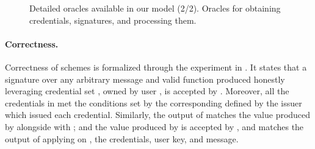 {\begin{figure*}[htp!]
{\begin{minipage}[t]{.5\textwidth}
        \procedure{$\SIGN(\oid,\uid,\scid,\msg,\feval)$}{%
          \pcif \uid \notin \HU: \pcreturn \bot \\
          (\sig,\yeval) \gets \Sign(\PRVUK[\uid],\PUBOK[\oid],\CRED[\scid],\msg,
          \feval) \\
          \SIG[\uid] \gets \SIG[\uid] \cup
          \lbrace (\oid,\scid,\sig,\yeval,\msg,\feval) \rbrace \\
          \pcreturn (\sig,\yeval) \\
        }                

        
      \end{minipage}
      
    }

    \caption{Detailed oracles available in our model (2/2). Oracles for
      obtaining credentials, signatures, and processing them.}
    \label{fig:oracles2}
  \end{figure*}
}

\paragraph{Correctness.} %
Correctness of \UAS schemes is formalized through the experiment in
. It states that a signature over any arbitrary message
and valid function \feval produced honestly leveraging credential set \scid,
owned by user \uid, is accepted by \Verify. Moreover, all the credentials in
\scid met the conditions set by the corresponding \fissue defined by the issuer
which issued each credential. Similarly, the output \yeval of \feval matches the
value produced by \Sign alongside with \sig; and the value produced by \Open
is accepted by \Judge, and matches the output of applying \finsp on \yeval, the
credentials, user key, and message.

